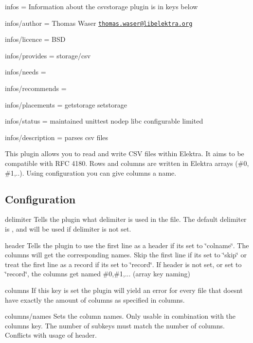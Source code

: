 
\begin{DoxyItemize}
\item infos = Information about the csvstorage plugin is in keys below
\item infos/author = Thomas Waser \href{mailto:thomas.waser@libelektra.org}{\tt thomas.\+waser@libelektra.\+org}
\item infos/licence = B\+SD
\item infos/provides = storage/csv
\item infos/needs =
\item infos/recommends =
\item infos/placements = getstorage setstorage
\item infos/status = maintained unittest nodep libc configurable limited
\item infos/description = parses csv files
\end{DoxyItemize}

This plugin allows you to read and write C\+SV files within Elektra. It aims to be compatible with R\+FC 4180. Rows and columns are written in Elektra arrays ({\ttfamily \#0}, {\ttfamily \#1},..). Using configuration you can give columns a name.

\subsection*{Configuration}

{\ttfamily delimiter} Tells the plugin what delimiter is used in the file. The default delimiter is {\ttfamily ,} and will be used if {\ttfamily delimiter} is not set.

{\ttfamily header} Tells the plugin to use the first line as a header if it\textquotesingle{}s set to \char`\"{}colname\char`\"{}. The columns will get the corresponding names. Skip the first line if it\textquotesingle{}s set to \char`\"{}skip\char`\"{} or treat the first line as a record if it\textquotesingle{}s set to \char`\"{}record\char`\"{}. If {\ttfamily header} is not set, or set to \char`\"{}record\char`\"{}, the columns get named \#0,\#1,... (array key naming)

{\ttfamily columns} If this key is set the plugin will yield an error for every file that doesn\textquotesingle{}t have exactly the amount of columns as specified in {\ttfamily columns}.

{\ttfamily columns/names} Sets the column names. Only usable in combination with the {\ttfamily columns} key. The number of subkeys must match the number of columns. Conflicts with usage of {\ttfamily header}.

